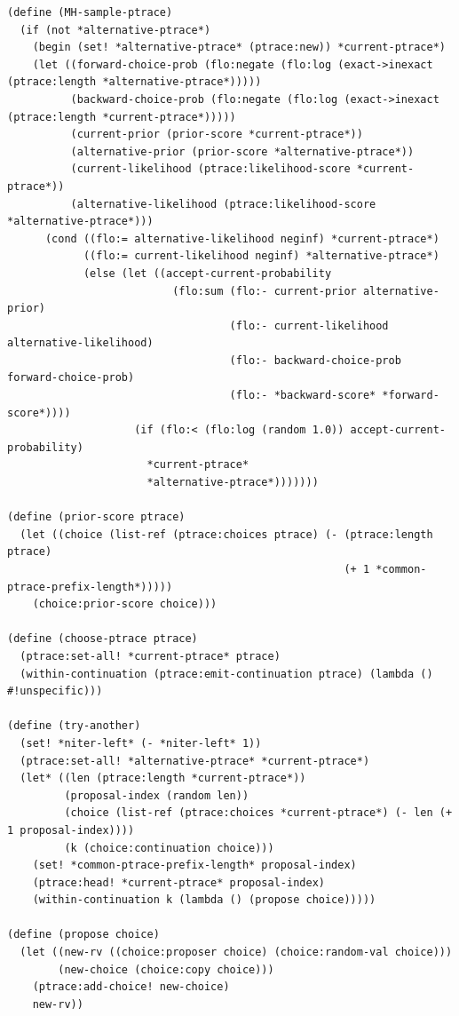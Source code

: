 \documentclass{article}
\begin{document}
\begin{verbatim}
(define (MH-sample-ptrace)
  (if (not *alternative-ptrace*)
    (begin (set! *alternative-ptrace* (ptrace:new)) *current-ptrace*)
    (let ((forward-choice-prob (flo:negate (flo:log (exact->inexact (ptrace:length *alternative-ptrace*)))))
          (backward-choice-prob (flo:negate (flo:log (exact->inexact (ptrace:length *current-ptrace*)))))
          (current-prior (prior-score *current-ptrace*))
          (alternative-prior (prior-score *alternative-ptrace*))
          (current-likelihood (ptrace:likelihood-score *current-ptrace*))
          (alternative-likelihood (ptrace:likelihood-score *alternative-ptrace*)))
      (cond ((flo:= alternative-likelihood neginf) *current-ptrace*)
            ((flo:= current-likelihood neginf) *alternative-ptrace*)
            (else (let ((accept-current-probability
                          (flo:sum (flo:- current-prior alternative-prior)
                                   (flo:- current-likelihood alternative-likelihood)
                                   (flo:- backward-choice-prob forward-choice-prob)
                                   (flo:- *backward-score* *forward-score*))))
                    (if (flo:< (flo:log (random 1.0)) accept-current-probability)
                      *current-ptrace*
                      *alternative-ptrace*)))))))

(define (prior-score ptrace)
  (let ((choice (list-ref (ptrace:choices ptrace) (- (ptrace:length ptrace)
                                                     (+ 1 *common-ptrace-prefix-length*)))))
    (choice:prior-score choice)))

(define (choose-ptrace ptrace)
  (ptrace:set-all! *current-ptrace* ptrace)
  (within-continuation (ptrace:emit-continuation ptrace) (lambda () #!unspecific)))

(define (try-another)
  (set! *niter-left* (- *niter-left* 1))
  (ptrace:set-all! *alternative-ptrace* *current-ptrace*)
  (let* ((len (ptrace:length *current-ptrace*))
         (proposal-index (random len))
         (choice (list-ref (ptrace:choices *current-ptrace*) (- len (+ 1 proposal-index))))
         (k (choice:continuation choice)))
    (set! *common-ptrace-prefix-length* proposal-index)
    (ptrace:head! *current-ptrace* proposal-index)
    (within-continuation k (lambda () (propose choice)))))

(define (propose choice)
  (let ((new-rv ((choice:proposer choice) (choice:random-val choice)))
        (new-choice (choice:copy choice)))
    (ptrace:add-choice! new-choice)
    new-rv))


\end{verbatim}
\end{document}
